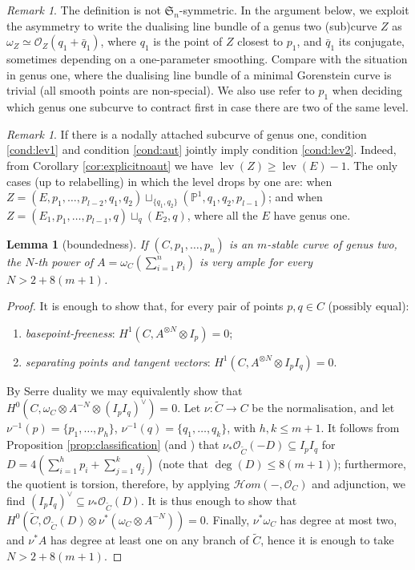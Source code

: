 \documentclass{compositio}
\newcommand{\PP}{\mathbb P}
\newcommand{\OO}{\mathcal O}
\renewcommand{\to}{\rightarrow}
\newcommand{\hhom}{\mathcal{H}\!om}
\newcommand{\lev}{\operatorname{lev}}
\theoremstyle{plain}
\newtheorem{lem}[thm]{Lemma}
\theoremstyle{definition}
\theoremstyle{remark}
\newtheorem{rem}[thm]{Remark}
\begin{document}
\begin{rem}
 The definition is not $\mathfrak{S}_n$-symmetric. In the argument below, we exploit the asymmetry to write the dualising line bundle of a genus two (sub)curve $Z$ as $\omega_Z\simeq\OO_Z(q_1+\bar q_1)$, where $q_1$ is the point of $Z$ closest to $p_1$, and $\bar q_1$ its conjugate, sometimes depending on a one-parameter smoothing. Compare with the situation in genus one, where the dualising line bundle of a minimal Gorenstein curve is trivial (all smooth points are non-special). We also use refer to $p_1$ when deciding which genus one subcurve to contract first in case there are two of the same level.
\end{rem}

\begin{rem}\label{rmk:lev1solev2}
 If there is a nodally attached subcurve of genus one, condition \eqref{cond:lev1} and condition \eqref{cond:aut} jointly imply condition \eqref{cond:lev2}. Indeed, from Corollary \ref{cor:explicitnoaut} we have $\lev(Z)\geq\lev(E)-1$. The only cases (up to relabelling) in which the level drops by one are: when $Z=(E,p_1,\ldots,p_{l-2},q_1,q_2)\sqcup_{\{q_1,q_2\}}(\PP^1,q_1,q_2,p_{l-1})$; and when $Z=(E_1,p_1,\ldots,p_{l-1},q)\sqcup_q(E_2,q)$, where all the $E$ have genus one.
\end{rem}


\begin{lem}[boundedness]
 If $(C,p_1,\ldots,p_n)$ is an $m$-stable curve of genus two, the $N$-th power of $A=\omega_C(\sum_{i=1}^np_i)$ is very ample for every $N>2+8(m+1)$.
\end{lem}
\begin{proof}
 It is enough to show that, for every pair of points $p,q\in C$ (possibly equal):
 \begin{enumerate}
  \item \emph{basepoint-freeness}: $H^1(C,A^{\otimes N}\otimes I_p)=0$;
  \item \emph{separating points and tangent vectors}: $H^1(C,A^{\otimes N}\otimes I_pI_q)=0$.
 \end{enumerate}
By Serre duality we may equivalently show that $H^0(C,\omega_C\otimes A^{-N}\otimes(I_pI_q)^\vee)=0$. Let $\nu\colon\tilde C\to C$ be the normalisation, and let $\nu^{-1}(p)=\{p_1,\ldots,p_h\}$, $\nu^{-1}(q)=\{q_1,\ldots,q_k\}$, with $h,k\leq m+1$. It follows from Proposition \ref{prop:classification} (and \cite[Proposition A.3]{SMY1}) that $\nu_*\OO_{\tilde C}(-D)\subseteq I_pI_q$ for $D=4(\sum_{i=1}^hp_i+\sum_{j=1}^kq_j)$ (note that $\deg(D)\leq 8(m+1)$); furthermore, the quotient is torsion, therefore, by applying $\hhom(-,\OO_C)$ and adjunction, we find $(I_pI_q)^\vee\subseteq\nu_*\OO_{\tilde C}(D)$. It is thus enough to show that $H^0(\tilde C,\OO_{\tilde C}(D)\otimes\nu^*(\omega_C\otimes A^{-N}))=0$. Finally, $\nu^*\omega_C$ has degree at most two, and $\nu^*A$ has degree at least one on any branch of $\tilde C$, hence it is enough to take $N>2+8(m+1)$.
\end{proof}
\end{document}
